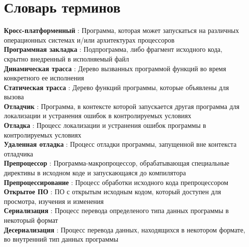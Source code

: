 \chapter*{Словарь терминов}             %

\textbf{Кросс-платформенный}     : Программа, которая может запускаться на различных операционных системах и/или архитектурах процессоров            \\
\textbf{Программная закладка}    : Подпрограмма, либо фрагмент исходного кода, скрытно внедренный в исполняемый файл                                 \\
\textbf{Динамическая трасса}     : Дерево вызванных программой функций во время конкретного ее исполнения                                            \\
\textbf{Статическая трасса}      : Дерево функций программы, которые объявлены для вызова                                                            \\
\textbf{Отладчик}                : Программа, в контексте которой запускается другая программа для локализации и устранения ошибок
в контролируемых условиях \\
\textbf{Отладка}                 : Процесс локализации и устранения ошибок программы в контролируемых условиях                                       \\
\textbf{Удаленная отладка}       : Процесс отладки программы, запущенной вне контекста отладчика                                                     \\
\textbf{Препроцессор}            : Программа-макропроцессор, обрабатывающая специальные директивы в исходном коде и запускающаяся до компилятора     \\
\textbf{Препроцессирование}      : Процесс обработки исходного кода препроцессором                                                                   \\
\textbf{Открытое ПО}             : ПО с открытым исходным кодом, который доступен для просмотра, изучения и изменения                                \\
\textbf{Сериализация}            : Процесс перевода определеного типа данных программы в некоторый формат                                            \\
\textbf{Десериализация}          : Процесс перевода данных, находящихся в некотором формате, во внутренний тип данных программы                      \\
